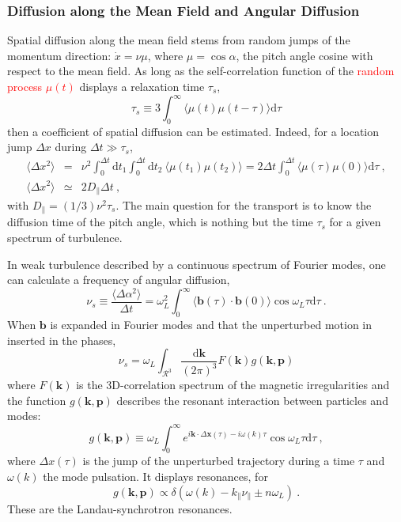 \documentclass[12pt,a4paper]{article}
\renewcommand{\vec}[1]{\boldsymbol{#1}}
\newcommand{\dif}{\mathrm{d}}
\begin{document}
\subsubsection{Diffusion along the Mean Field and Angular Diffusion}
Spatial diffusion along the mean field stems from random jumps of the momentum direction: $\dot{x} = \nu \mu$, where $\mu = \cos \alpha$, the pitch angle cosine with respect to the mean field. As long as the self-correlation function of the \textcolor{red}{random process $\mu(t)$} displays a relaxation time $\tau_s$,
\begin{equation}
\tau_s \equiv 3 \int_0^\infty \langle \mu(t) \mu(t-\tau) \rangle \dif \tau
\end{equation}
then a coefficient of spatial diffusion can be estimated. Indeed, for a location jump $\Delta x$ during $\Delta t \gg \tau_s$,
\begin{eqnarray}
\langle \Delta x^2 \rangle &=& \nu^2 \int_0^{\Delta t} \dif t_1 \int_0^{\Delta t} \dif t_2~ \langle \mu(t_1) \mu(t_2) \rangle = 2\Delta t  \int_0^{\Delta t} \langle \mu(\tau) \mu(0) \rangle \dif \tau ~, \\
\langle \Delta x^2 \rangle &\simeq& 2D_\parallel \Delta t ~,
\end{eqnarray}
with $D_\parallel = (1/3)\nu^2 \tau_s$. The main question for the transport is to know the diffusion time of the pitch angle, which is nothing but the time $\tau_s$ for a given spectrum of turbulence.

In weak turbulence described by a continuous spectrum of Fourier modes, one can calculate a frequency of angular diffusion, 
\begin{equation}
\nu_s \equiv \frac{\langle \Delta \alpha^2 \rangle}{\Delta t}  = \omega_L^2 \int_0^\infty \langle \vec{b}(\tau) \cdot \vec{b}(0) \rangle \cos \omega_L \tau \dif \tau ~.
\end{equation}
When $\vec{b}$ is expanded in Fourier modes and that the unperturbed motion in inserted in the phases,
\begin{equation}
\nu_s = \omega_L \int_{\mathcal R^3}  \frac{\dif \vec{k}}{(2\pi)^3} F(\vec{k}) g(\vec{k}, \vec{p})
\end{equation}
where $F(\vec{k})$ is the 3D-correlation spectrum of the magnetic irregularities and the function $g(\vec{k}, \vec{p})$ describes the resonant interaction between particles and modes:
\begin{equation}
g(\vec{k}, \vec{p}) \equiv  \omega_L \int_0^\infty e^{i\vec{k}\cdot \Delta \vec{x}(\tau) -i\omega(k) \tau} \cos \omega_L \tau \dif \tau ~,
\end{equation}
where $\Delta x(\tau)$ is the jump of the unperturbed trajectory during a time $\tau$ and $\omega(k)$ the mode pulsation. It displays resonances, for
\begin{equation}
g(\vec{k}, \vec{p}) \propto \delta(\omega(k) -k_\parallel \nu_\parallel \pm n \omega_L) ~.
\end{equation}
These are the Landau-synchrotron resonances.
\end{document}
